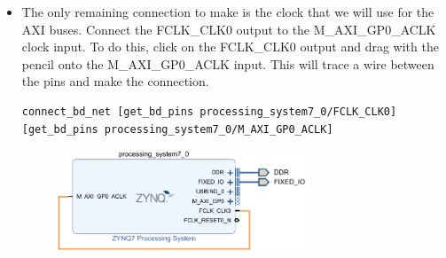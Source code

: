\documentclass[a4paper,12pt,twoside]{article}
\begin{document}
\begin{itemize}
\begin{figure}[H]
    \end{figure}
    \item The only remaining connection to make is the clock that we will use for the AXI buses. Connect the FCLK\_CLK0 output to the M\_AXI\_GP0\_ACLK clock input. To do this, click on the FCLK\_CLK0 output and drag with the pencil onto the M\_AXI\_GP0\_ACLK input. This will trace a wire between the pins and make the connection.
    \begin{verbatim}
connect_bd_net [get_bd_pins processing_system7_0/FCLK_CLK0] [get_bd_pins processing_system7_0/M_AXI_GP0_ACLK]
    \end{verbatim}
    \begin{figure}[H]
        \centering
        \includegraphics[width=0.7\textwidth]{images/5.png}
    \end{figure}
\end{itemize}
\end{document}
